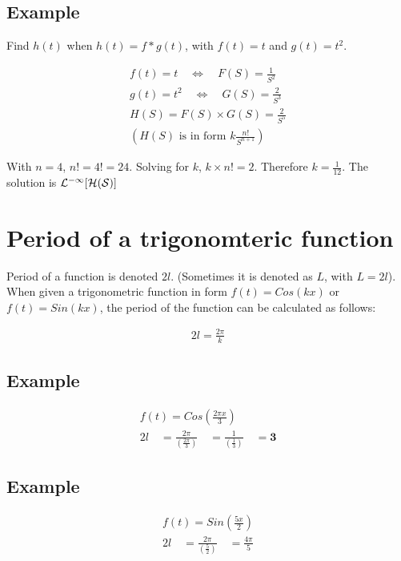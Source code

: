 \documentclass[12pt, a4paper]{article}
\begin{document}
\author{Kevin O'Brien}
\tableofcontents

\subsection{Example}
Find $h(t)$ when $h(t) = f*g(t)$, with $f(t)= t$ and $g(t)=
t^2$.\newline

\begin{eqnarray}
f(t) = t \quad \Leftrightarrow \quad F(S)= \frac{1}{S^2}
 \nonumber\\
g(t) = t^2 \quad \Leftrightarrow \quad G(S)= \frac{2}{S^3}
 \nonumber\\
H(S) = F(S)\times G(S) = \frac{2}{S^5}
 \nonumber\\
(H(S) \mbox{ is in form }  k\frac{n!}{S^{n+1}} )
 \nonumber
\end{eqnarray}

With $n=4$, $n!= 4! = 24$. Solving for $k$, $k \times n! = 2$.
Therefore $k=\frac{1}{12}$. The solution is $\cal{L}^{-1}[H(S)]$

\section{Period of a trigonomteric function}
Period of a function is denoted $2l$. (Sometimes it is denoted as
$L$, with $L=2l$). \newline When given a trigonometric function in
form $f(t) = Cos(kx)$ or $f(t)= Sin(kx)$, the period of the
function can be calculated as follows:

\begin{eqnarray}
2l = \frac{2 \pi}{k}\nonumber
\end{eqnarray}


\subsection{Example}
\begin{eqnarray}f(t) = Cos(\frac{2 \pi x}{3}) \nonumber\\
2l \quad=\frac{2\pi}{(\frac{2\pi}{3})}\quad =
\frac{1}{(\frac{1}{3})}\quad= \textbf{3}\nonumber
\end{eqnarray}

\subsection{Example}
\begin{eqnarray}f(t) = Sin(\frac{5x}{2}) \nonumber\\
2l \quad=\frac{2\pi}{(\frac{5}{2})}\quad = \frac{4\pi}{5}\nonumber
\end{eqnarray}
\end{document}
